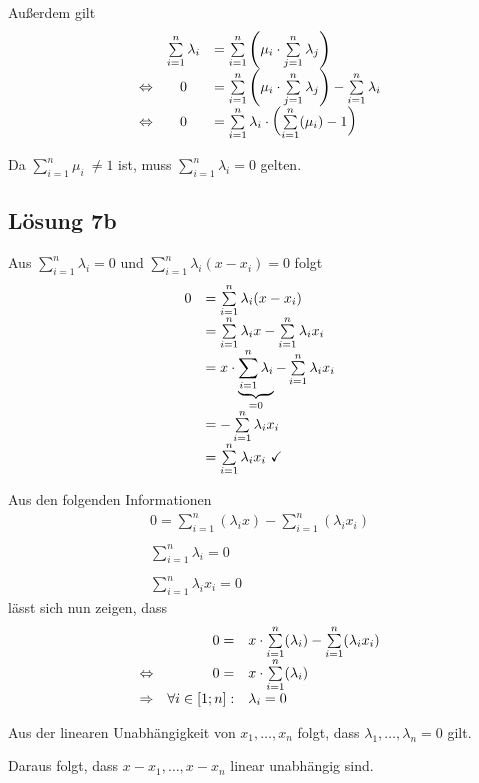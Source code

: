 \documentclass[main.tex]{subfiles}
\begin{document}
Außerdem gilt
\begin{equation*}
    \begin{array}{ c c l }
        & \sum\limits _{i=1}^{n} \lambda _{i} & =\sum\limits _{i=1}^{n}\left( \mu _{i} \cdotp \sum\limits _{j=1}^{n} \lambda _{j}\right)\\
        \Leftrightarrow  & 0 & =\sum\limits _{i=1}^{n}\left( \mu _{i} \cdotp \sum\limits _{j=1}^{n} \lambda _{j}\right) -\sum\limits _{i=1}^{n} \lambda _{i}\\
        \Leftrightarrow  & 0 & =\sum\limits _{i=1}^{n} \lambda _{i} \cdotp \left(\sum\limits _{i=1}^{n}( \mu _{i}) -1\right)
    \end{array}
\end{equation*}

Da $\sum _{i=1}^{n} \mu _{i} \ \neq 1$ ist, muss $\sum\nolimits _{i=1}^{n} \lambda _{i} =0$ gelten.

\subsection{Lösung 7b}

Aus $\sum\nolimits _{i=1}^{n} \lambda _{i} =0$ und $\sum\nolimits _{i=1}^{n} \lambda _{i}( x-x_{i}) =0$ folgt
\begin{equation*}
    \begin{array}{ c l }
    0 & =\sum\limits _{i=1}^{n} \lambda _{i}( x-x_{i})\\
    & =\sum\limits _{i=1}^{n} \lambda _{i} x-\sum\limits _{i=1}^{n} \lambda _{i} x_{i}\\
    & =x\cdotp \underbrace{\sum\limits _{i=1}^{n} \lambda _{i}}_{=0} -\sum\limits _{i=1}^{n} \lambda _{i} x_{i}\\
    & =-\sum\limits _{i=1}^{n} \lambda _{i} x_{i}\\
    & =\sum\limits _{i=1}^{n} \lambda _{i} x_{i} \ \checked 
    \end{array}
\end{equation*}

Aus den folgenden Informationen
\begin{gather*}
    0=\sum\limits _{i=1}^{n}( \lambda _{i} x) -\sum\limits _{i=1}^{n}( \lambda _{i} x_{i})\\
    \\
    \sum\limits _{i=1}^{n} \lambda _{i} =0\\
    \\
    \sum\limits _{i=1}^{n} \lambda _{i} x_{i} =0
\end{gather*}
lässt sich nun zeigen, dass
\begin{equation*}
    \begin{array}{ c r l }
        & 0= & x\cdotp \sum\limits _{i=1}^{n}( \lambda _{i}) -\sum\limits _{i=1}^{n}( \lambda _{i} x_{i})\\
        \Leftrightarrow  & 0= & x\cdotp \sum\limits _{i=1}^{n}( \lambda _{i})\\
        \Rightarrow  & \forall i\in [ 1;n] : & \lambda _{i} =0
    \end{array}
\end{equation*}


Aus der linearen Unabhängigkeit von $x_1, \dotsc, x_n$ folgt, dass $\lambda_1, \dotsc, \lambda_n = 0$ gilt. \checkmark

Daraus folgt, dass $x-x_1, \dotsc, x-x_n$ linear unabhängig sind.
\end{document}
